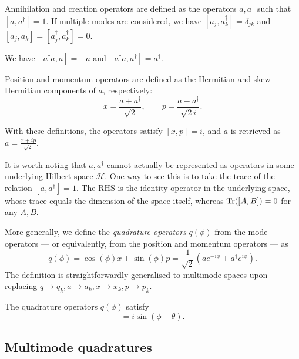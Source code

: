 \documentclass[12pt]{report}
\newcommand{\calH}{{\mathcal{H}}}
\begin{document}
\begin{defn}
	Annihilation and creation operators are defined as the operators $a,a^\dagger$ such that $[a,a^\dagger]=1$.
	If multiple modes are considered, we have $[a_j,a_k^\dagger]=\delta_{jk}$ and $[a_j,a_k]=[a_j^\dagger,a_k^\dagger]=0$.
\end{defn}

\begin{prop}
	We have $[a^\dagger a, a] = -a$ and
	$[a^\dagger a, a^\dagger] = a^\dagger$.
\end{prop}

\begin{defn}
	Position and momentum operators are defined as the Hermitian and skew-Hermitian components of $a$, respectively:
	\begin{equation}
		x = \frac{a + a^\dagger}{\sqrt2},
		\qquad
		p = \frac{a - a^\dagger}{\sqrt2 i}.
	\end{equation}
\end{defn}
With these definitions, the operators satisfy $[x,p]=i$, and $a$ is retrieved as
$a = \frac{x + ip}{\sqrt2}$.

It is worth noting that $a,a^\dagger$ cannot actually be represented as operators in some underlying Hilbert space $\calH$. One way to see this is to take the trace of the relation $[a,a^\dagger]=1$.
The RHS is the identity operator in the underlying space, whose trace equals the dimension of the space itself, whereas $\Tr([A,B])=0$ for any $A,B$.

\begin{defn}
	More generally, we define the \emph{quadrature operators} $q(\phi)$ from the mode operators --- or equivalently, from the position and momentum operators --- as
	\begin{equation}
		q(\phi) = \cos(\phi) x + \sin(\phi) p
		= \frac{1}{\sqrt2}(a e^{-i\phi} + a^\dagger e^{i\phi}).
	\end{equation}
	The definition is straightforwardly generalised to multimode spaces upon replacing $q\to q_k, a\to a_k, x\to x_k,p\to p_k$.
\end{defn}

\begin{prop}
	The quadrature operators $q(\phi)$ satisfy
	\begin{equation}
		[q(\theta), q(\phi)] = i \sin(\phi-\theta).
	\end{equation}
\end{prop}

\subsection{Multimode quadratures}
\end{document}
